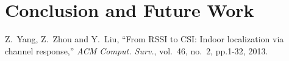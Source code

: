 \documentclass[10pt,conference,compsocconf,letterpaper]{IEEEtran}
\begin{document}
\section{Conclusion and Future Work}\label{concandfuture}





%

\begin{thebibliography}{99}

Z.~Yang, Z.~Zhou and Y.~Liu, ``From RSSI to CSI: Indoor localization via channel response,'' \emph{ACM Comput. Surv.}, vol.~46, no.~2, pp.1-32, 2013.






\end{thebibliography}
\end{document}
